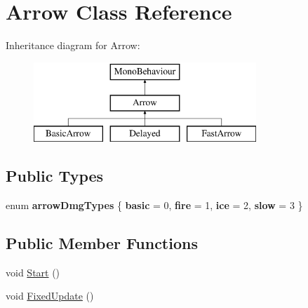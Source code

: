 \hypertarget{class_arrow}{}\section{Arrow Class Reference}
\label{class_arrow}
Inheritance diagram for Arrow\+:\begin{figure}[H]
\begin{center}
\leavevmode
\includegraphics[height=3.000000cm]{class_arrow}
\end{center}
\end{figure}
\subsection*{Public Types}
\begin{DoxyCompactItemize}
\item 
\mbox{\label{class_arrow_a6f10bb69bb3cb23483035a0eb1b286fa}} 
enum {\bfseries arrow\+Dmg\+Types} \{ {\bfseries basic} = 0, 
{\bfseries fire} = 1, 
{\bfseries ice} = 2, 
{\bfseries slow} = 3
 \}
\end{DoxyCompactItemize}
\subsection*{Public Member Functions}
\begin{DoxyCompactItemize}
\item 
void \hyperlink{class_arrow_a65ce0e1a14405dec237e13ee5631b07d}{Start} ()
\item 
void \hyperlink{class_arrow_aaf1023833f6420f4920d9013f9c46ef3}{Fixed\+Update} ()
\end{DoxyCompactItemize}
